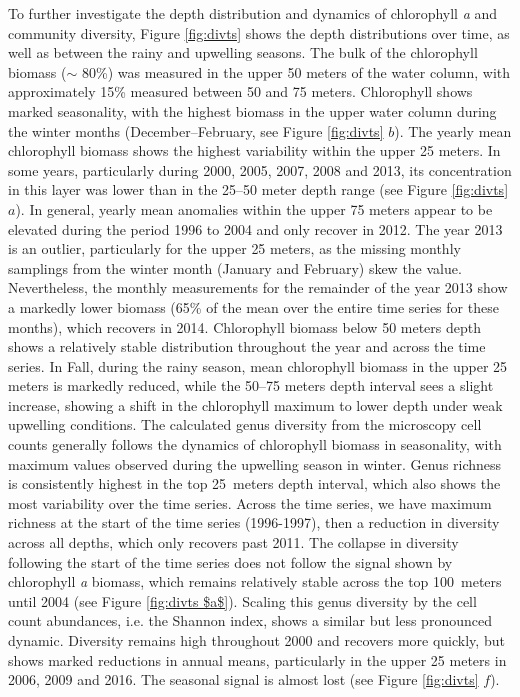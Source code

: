 \documentclass[draft]{agujournal2019}
\begin{document}
To further investigate the depth distribution and dynamics of chlorophyll \textit{a} and community diversity, Figure \ref{fig:divts} shows the depth distributions over time, as well as between the rainy and upwelling seasons. The bulk of the chlorophyll biomass ($\sim$ 80\%) was measured in the upper 50 meters of the water column, with approximately 15\% measured between 50 and 75 meters. Chlorophyll shows marked seasonality, with the highest biomass in the upper water column during the winter months (December–February, see Figure \ref{fig:divts} $b$). The yearly mean chlorophyll biomass shows the highest variability within the upper 25 meters. In some years, particularly during 2000, 2005, 2007, 2008 and 2013, its concentration in this layer was lower than in the 25–50 meter depth range (see Figure \ref{fig:divts} $a$). In general, yearly mean anomalies within the upper 75 meters appear to be elevated during the period 1996 to 2004 and only recover in 2012. The year 2013 is an outlier, particularly for the upper 25 meters, as the missing monthly samplings from the winter month (January and February) skew the value. Nevertheless, the monthly measurements for the remainder of the year 2013 show a markedly lower biomass (65\% of the mean over the entire time series for these months), which recovers in 2014. Chlorophyll biomass below 50 meters depth shows a relatively stable distribution throughout the year and across the time series. In Fall, during the rainy season, mean chlorophyll biomass in the upper 25 meters is markedly reduced, while the 50–75 meters depth interval sees a slight increase, showing a shift in the chlorophyll maximum to lower depth under weak upwelling conditions.
The calculated genus diversity from the microscopy cell counts generally follows the dynamics of chlorophyll biomass in seasonality, with maximum values observed during the upwelling season in winter. Genus richness is consistently highest in the top \qty{25}{meters} depth interval, which also shows the most variability over the time series. Across the time series, we have maximum richness at the start of the time series (1996-1997), then a reduction in diversity across all depths, which only recovers past 2011. The collapse in diversity following the start of the time series does not follow the signal shown by chlorophyll \textit{a} biomass, which remains relatively stable across the top \qty{100}{meters} until 2004 (see Figure \ref{fig:divts $a$}). Scaling this genus diversity by the cell count abundances, i.e. the Shannon index, shows a similar but less pronounced dynamic. Diversity remains high throughout 2000 and recovers more quickly, but shows marked reductions in annual means, particularly in the upper 25 meters in 2006, 2009 and 2016. The seasonal signal is almost lost (see Figure \ref{fig:divts} $f$). 
\end{document}
